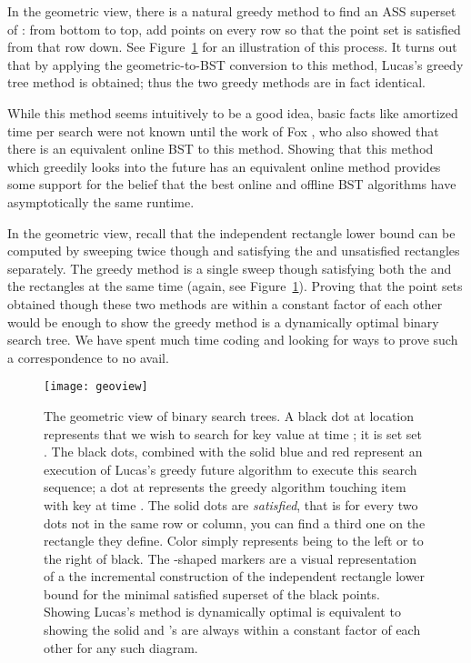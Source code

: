 \documentclass[11pt]{article}
\begin{document}
In the geometric view, there is a natural greedy method to find an ASS superset of : from bottom to top, add points on every row so that the point set is satisfied from that row down. See Figure~\ref{geoview} for an illustration of this process.
It turns out that by applying the geometric-to-BST conversion to this method, Lucas's greedy tree method is obtained; thus the two greedy methods are in fact identical.

While this method seems intuitively to be a good idea, basic facts like  amortized time per search were not known until the work of Fox \cite{DBLP:conf/wads/Fox11}, who also showed that there is an equivalent online BST to this method. Showing that this method which greedily looks into the future has an equivalent online method provides some support for the belief that the best online and offline BST algorithms have asymptotically the same runtime.

In the geometric view, recall that the independent rectangle lower bound can be computed by sweeping twice though  and satisfying the  and  unsatisfied rectangles separately. The greedy method is a single sweep though  satisfying both the  and the  rectangles at the same time (again, see Figure~\ref{geoview}). Proving that the point sets obtained though these two methods are within a constant factor of each other would be enough to show the greedy method is a dynamically optimal binary search tree. We have spent much time coding and looking for ways to prove such a correspondence to no avail.


\begin{figure}
\begin{center}
\texttt{[image: geoview]}
\end{center}
\caption{The geometric view of binary search trees.
A black dot at location  represents that we wish to search for key value  at time ; it is set set . The black dots, combined with the solid blue and red represent an execution of Lucas's greedy future algorithm to execute this search sequence; a dot at  represents the greedy algorithm touching item with key  at time . The solid dots are \emph{satisfied}, that is for every two dots not in the same row or column, you can find a third one on the rectangle they define. Color simply represents being to the left or to the right of black. The -shaped markers are a visual representation of a the incremental construction of the independent rectangle lower bound for the minimal satisfied superset of the black points. Showing Lucas's method is dynamically optimal is equivalent to showing the solid and 's are always within a constant factor of each other for any such diagram.} 
\label{geoview}
\end{figure}
\end{document}
